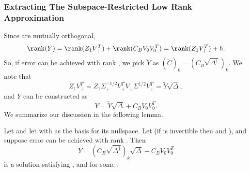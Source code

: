 \subsubsection{Extracting The Subspace-Restricted Low Rank Approximation}
Since  are mutually orthogonal,
$$\rank(Y)=\rank(Z_1V_+^T)+\rank(C_BV_0V_0^T)=\rank(Z_1V_+^T)+h.$$
So, if error \math{\beta} can be achieved with rank 
, we pick $\tilde Y$ as $(\tilde C)_k = (C_B\sqrt{\Delta^{\dagger}} )_k$.  We note that 
\[ Z_1 V_+ ^T = Z_1 {\Sigma}^{-1/2}_+V_+ ^T V_+ \Sigma^{1/2} V_+ ^T = \tilde Y \sqrt{\Delta},  \]
and $Y$ can be constructed as
\[ Y = \tilde Y \sqrt{\Delta} + C_B V_0 V_0 ^T. \]
We summarize our discussion in the following lemma.
\begin{lemma}\label{achievable}
Let  and let  with
 as the basis for its nullspace. Let 
 (if \math{\Delta} is invertible then
 and ), and suppose error \math{\beta} can be achieved with 
rank .
Then 
$$
Y=(C_B \sqrt{\Delta^{\dagger}})_k \sqrt{\Delta} +C_BV_0V_0^T
$$
is a solution satisfying , 
 and  for some .
\end{lemma}

